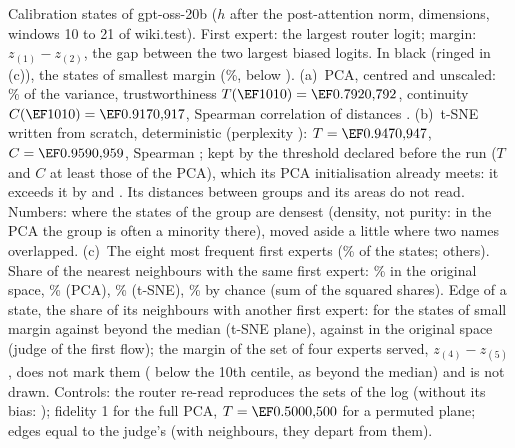 {Calibration states of gpt-oss-20b ($h$ after the post-attention norm, \LatDim{} dimensions, windows 10 to 21 of
wiki.test). First expert: the largest router logit; margin: $z_{(1)}-z_{(2)}$, the gap between the two largest biased
logits. In black (ringed in (c)), the \LatFragiles{} states of smallest margin (\LatMargeQuantile\%, below \LatMargeDouzeDix).
(a)~PCA, centred and unscaled: \LatAcpVarPlan\% of the variance, trustworthiness $T(\LatK)=\LatAcpT$, continuity
$C(\LatK)=\LatAcpC$, Spearman correlation of distances \LatAcpRho. (b)~t-SNE written from scratch, deterministic
(perplexity \LatTsnePerplexite): $T=\LatTsneT$, $C=\LatTsneC$, Spearman \LatTsneRho; kept by the threshold declared
before the run ($T$ and $C$ at least those of the PCA), which its PCA initialisation already meets: it exceeds it by
\LatTsneGainT{} and \LatTsneGainC. Its distances between groups and its areas do not read. Numbers: where the states
of the group are densest (density, not purity: in the PCA the group is often a minority there), moved aside a little
where two names overlapped. (c)~The eight most frequent first experts (\LatGroupesPart\% of the states;
\LatAutresExperts{} others). Share of the \LatK{} nearest neighbours with the same first expert: \LatAccordHaut\% in
the original space, \LatAcpAccord\% (PCA), \LatTsneAccord\% (t-SNE), \LatAccordHasard\% by chance (sum of the squared
shares). Edge of a state, the share of its \LatKBord{} neighbours with another first expert: \LatBordFragile{} for the
states of small margin against \LatBordLarge{} beyond the median (t-SNE plane), \LatBordOrigFragile{} against
\LatBordOrigLarge{} in the original space (judge of the first flow); the margin of the set of four experts served,
$z_{(4)}-z_{(5)}$, does not mark them (\LatBordQuatreCinq{} below the 10th centile, as \LatBordQuatreCinqLarge{} beyond the median) and is not drawn. Controls: the router re-read reproduces the
\LatWzeroEnsembles{} sets of the log (without its bias: \LatWzeroCassure); fidelity 1 for the full PCA,
$T=\LatTemoinPermuteT$ for a permuted plane; edges equal to the judge's (with \LatKBordCasse{} neighbours, they depart
from them).}%
